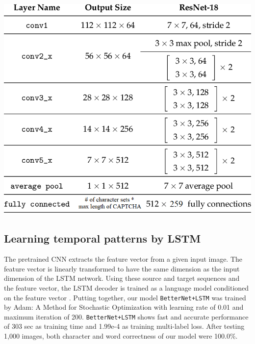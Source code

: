 \documentclass[10pt,twocolumn, letterpaper]{article}
\begin{document}
\begin{center}
\includegraphics[width=1\linewidth]{./resnet18.png}
\end{center}

\subsection{Learning temporal patterns by LSTM}
The pretrained CNN extracts the feature vector from a given input image. The feature vector is linearly transformed to have the same dimension as the input dimension of the LSTM network. Using these source and target sequences and the feature vector, the LSTM decoder is trained as a language model conditioned on the feature vector \cite{image-captioning}. Putting together, our model \texttt{BetterNet+LSTM} was trained by Adam: A Method for Stochastic Optimization\cite{adam} with learning rate of 0.01 and maximum iteration of 200. \texttt{BetterNet+LSTM} shows fast and accurate performance of 303 sec as training time and 1.99e-4 as training multi-label loss. After testing 1,000 images, both character and word correctness of our model were 100.0\%.
\end{document}
